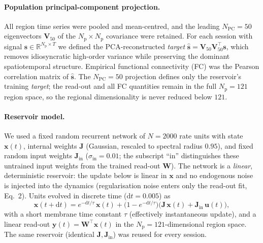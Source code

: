 \documentclass[11pt]{article}
\begin{document}
\paragraph{Population principal-component projection.}
All region time series were pooled and mean-centred, and the leading
$N_{\mathrm{PC}}=50$ eigenvectors $\mathbf{V}_{50}$ of the
$N_{\mathrm{p}}\times N_{\mathrm{p}}$ covariance were retained. For each session
with signal $\mathbf{s}\in\mathbb{R}^{N_{\mathrm{p}}\times T}$ we defined the
PCA-reconstructed \emph{target}
$\hat{\mathbf{s}} = \mathbf{V}_{50}\mathbf{V}_{50}^{\!\top}\mathbf{s}$, which
removes idiosyncratic high-order variance while preserving the dominant
spatiotemporal structure. Empirical functional connectivity (FC) was the
Pearson correlation matrix of $\hat{\mathbf{s}}$. The $N_{\mathrm{PC}}=50$
projection defines only the reservoir's training \emph{target}; the read-out and
all FC quantities remain in the full $N_{\mathrm{p}}=121$ region space, so the
regional dimensionality is never reduced below $121$.

\paragraph{Reservoir model.}
We used a fixed random recurrent network of $N=2000$ rate units with state
$\mathbf{x}(t)$, internal weights $\mathbf{J}$ (Gaussian, rescaled to spectral
radius $0.95$), and fixed random input weights $\mathbf{J}_{\mathrm{in}}$
($\sigma_{\mathrm{in}}=0.01$; the subscript ``in'' distinguishes these untrained
input weights from the trained read-out $\mathbf{W}$). The network is a
\emph{linear}, deterministic reservoir: the update below is linear in
$\mathbf{x}$ and no endogenous noise is injected into the dynamics
(regularisation noise enters only the read-out fit, Eq.~2). Units evolved in
discrete time ($\mathrm{d}t=0.005$) as
\begin{equation}
\mathbf{x}(t+\mathrm{d}t) = e^{-\mathrm{d}t/\tau}\,\mathbf{x}(t)
  + \bigl(1-e^{-\mathrm{d}t/\tau}\bigr)
    \bigl(\mathbf{J}\,\mathbf{x}(t) + \mathbf{J}_{\mathrm{in}}\,\mathbf{u}(t)\bigr),
\end{equation}
with a short membrane time constant $\tau$ (effectively instantaneous update),
and a linear read-out $\mathbf{y}(t)=\mathbf{W}^{\!\top}\mathbf{x}(t)$ in the
$N_{\mathrm{p}}=121$-dimensional region space. The same reservoir (identical
$\mathbf{J},\mathbf{J}_{\mathrm{in}}$) was reused for every session.
\end{document}
